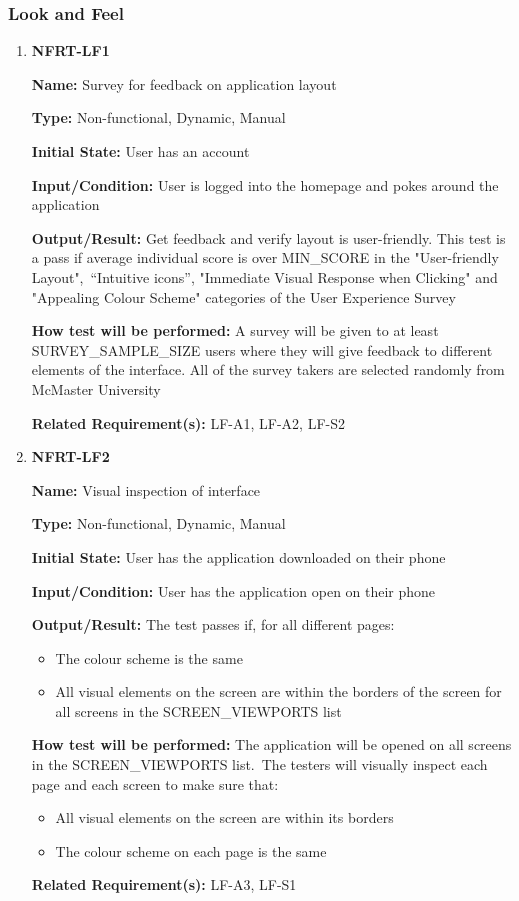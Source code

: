 \documentclass[12pt, titlepage]{article}
\begin{document}
\subsubsection{Look and Feel}

\begin{enumerate}
\item{\textbf{NFRT-LF1}}

\textbf{Name:} Survey for feedback on application layout

\textbf{Type:} Non-functional, Dynamic, Manual
					
\textbf{Initial State:} User has an account

\textbf{Input/Condition:} User is logged into the homepage and pokes around the application
					
\textbf{Output/Result:} Get feedback and verify layout is user-friendly. This test is a pass if average individual score is over MIN\_SCORE in the "User-friendly Layout",\
“Intuitive icons”, "Immediate Visual Response when Clicking" and "Appealing Colour Scheme" categories of the User Experience Survey
					
\textbf{How test will be performed:} A survey will be given to at least
SURVEY\_SAMPLE\_SIZE users where they will give feedback to different elements of the interface. All of the survey takers are selected randomly from McMaster University

\textbf{Related Requirement(s):} LF-A1, LF-A2, LF-S2

\item{\textbf{NFRT-LF2}}

\textbf{Name:} Visual inspection of interface

\textbf{Type:} Non-functional, Dynamic, Manual
					
\textbf{Initial State:} User has the application downloaded on their phone
					
\textbf{Input/Condition:} User has the application open on their phone
					
\textbf{Output/Result:} The test passes if, for all different pages:
\begin{itemize}
  \item The colour scheme is the same
  \item All visual elements on the screen are within the borders of the screen for all screens in the SCREEN\_VIEWPORTS list
\end{itemize}

\textbf{How test will be performed:} The application will be opened on all screens in the SCREEN\_VIEWPORTS list.\
The testers will visually inspect each page and each screen to make sure that:
\begin{itemize}
  \item All visual elements on the screen are within its borders
  \item The colour scheme on each page is the same
\end{itemize}

\textbf{Related Requirement(s):} LF-A3, LF-S1

\end{enumerate}
\end{document}
